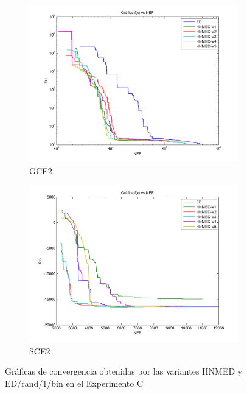 \begin{figure}
\begin{subfigure}[b]{0.49\linewidth}
		\includegraphics[width=\linewidth]{Figures/C-Grafica_Convergencia_Problema_5}
		\caption{GCE2} \label{fig:G2} 
	\end{subfigure}
	\begin{subfigure}[b]{0.49\linewidth}
		\includegraphics[width=\linewidth]{Figures/C-Grafica_Convergencia_Problema_6}
		\caption{SCE2} \label{fig:S1} 
	\end{subfigure}
	\caption{Gráficas de convergencia obtenidas por las variantes HNMED y ED/rand/1/bin en el Experimento C} \label{fig: Gráficas de convergencia para las variantes HNMED y ED/rand/1/bin para el Experimento C} 
	
\end{figure}
